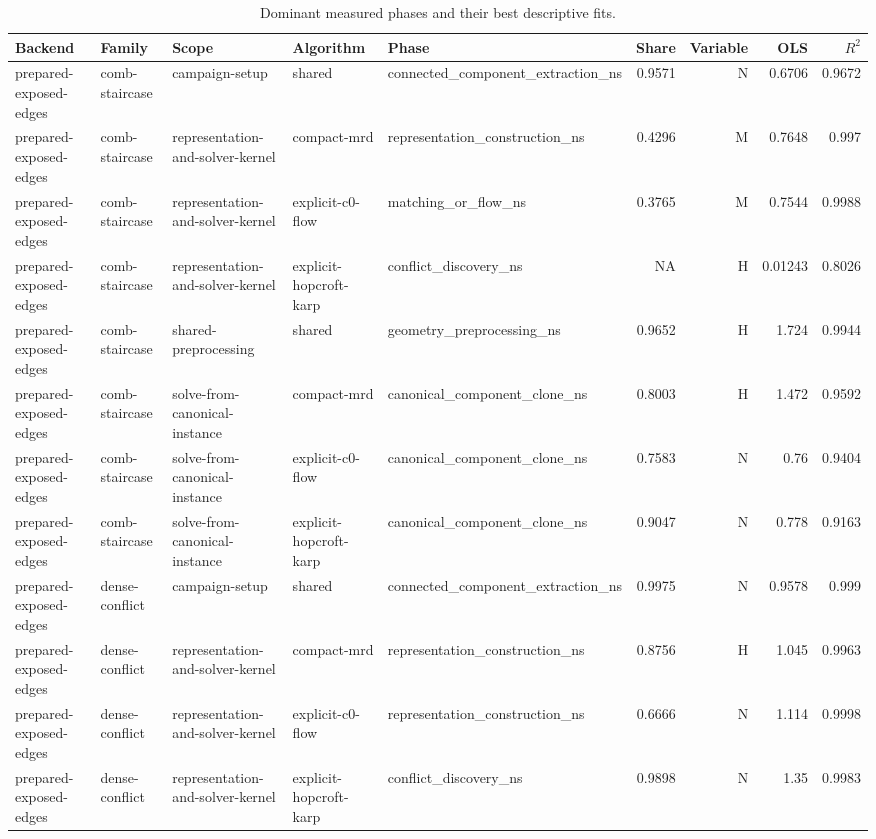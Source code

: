 \begin{table}[t]
\caption{Dominant measured phases and their best descriptive fits.}
\label{tab:kernel-phases}
\begin{tabular}{lllllrrrr}
\toprule
Backend & Family & Scope & Algorithm & Phase & Share & Variable & OLS & $R^2$ \\
\midrule
prepared-exposed-edges & comb-staircase & campaign-setup & shared & connected\_component\_extraction\_ns & 0.9571 & N & 0.6706 & 0.9672 \\
prepared-exposed-edges & comb-staircase & representation-and-solver-kernel & compact-mrd & representation\_construction\_ns & 0.4296 & M & 0.7648 & 0.997 \\
prepared-exposed-edges & comb-staircase & representation-and-solver-kernel & explicit-c0-flow & matching\_or\_flow\_ns & 0.3765 & M & 0.7544 & 0.9988 \\
prepared-exposed-edges & comb-staircase & representation-and-solver-kernel & explicit-hopcroft-karp & conflict\_discovery\_ns & NA & H & 0.01243 & 0.8026 \\
prepared-exposed-edges & comb-staircase & shared-preprocessing & shared & geometry\_preprocessing\_ns & 0.9652 & H & 1.724 & 0.9944 \\
prepared-exposed-edges & comb-staircase & solve-from-canonical-instance & compact-mrd & canonical\_component\_clone\_ns & 0.8003 & H & 1.472 & 0.9592 \\
prepared-exposed-edges & comb-staircase & solve-from-canonical-instance & explicit-c0-flow & canonical\_component\_clone\_ns & 0.7583 & N & 0.76 & 0.9404 \\
prepared-exposed-edges & comb-staircase & solve-from-canonical-instance & explicit-hopcroft-karp & canonical\_component\_clone\_ns & 0.9047 & N & 0.778 & 0.9163 \\
prepared-exposed-edges & dense-conflict & campaign-setup & shared & connected\_component\_extraction\_ns & 0.9975 & N & 0.9578 & 0.999 \\
prepared-exposed-edges & dense-conflict & representation-and-solver-kernel & compact-mrd & representation\_construction\_ns & 0.8756 & H & 1.045 & 0.9963 \\
prepared-exposed-edges & dense-conflict & representation-and-solver-kernel & explicit-c0-flow & representation\_construction\_ns & 0.6666 & N & 1.114 & 0.9998 \\
prepared-exposed-edges & dense-conflict & representation-and-solver-kernel & explicit-hopcroft-karp & conflict\_discovery\_ns & 0.9898 & N & 1.35 & 0.9983 \\

\end{tabular}
\end{table}

